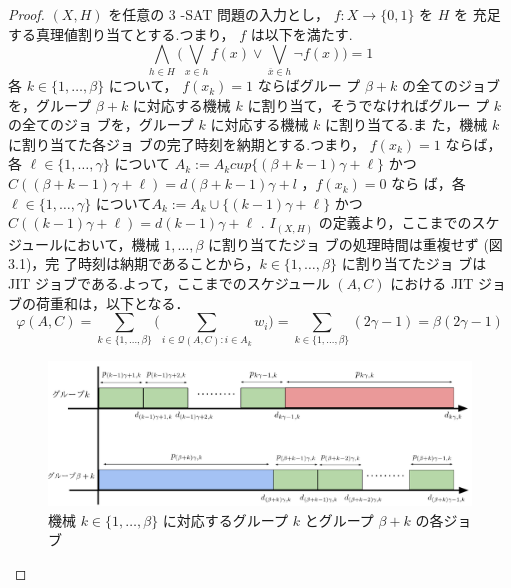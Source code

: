 \documentclass[12pt]{optlab-bachelor}
\begin{document}
\begin{proof}
  $(X,H)$ を任意の 3 -SAT 問題の入力とし， $f : X \to \{0,1\}$ を $H$ を
  充足する真理値割り当てとする.つまり， $f$ は以下を満たす.
  \begin{displaymath}
    \displaystyle \bigwedge_{h \in H} \bigg(\bigvee_{x \in h}f(x) \lor
    \bigvee_{\bar x \in h}\lnot f(x) \bigg) = 1
  \end{displaymath}
  各 $k \in \{1,\ldots, \beta\}$ について， $f(x_k) = 1$ ならばグルー
  プ $\beta + k$ の全てのジョブを，グループ $\beta + k$ に対応する機械
  $k$ に割り当て，そうでなければグルー
  プ $k$ の全てのジョ ブを，グループ $k$ に対応する機械 $k$ に割り当てる.ま
  た，機械 $k$ に割り当てた各ジョ ブの完了時刻を納期とする.つまり，
  $f(x_k) = 1$ ならば，各 $\ell \in \{1,\ldots,\gamma\}$ について $A_k
  :=A_k cup\{(\beta+k−1)\gamma+\ell\}$ かつ
  $C((\beta+k−1)\gamma+\ell)=d(\beta+k−1)\gamma+l$ ，$f(x_k)=0$ なら
  ば，各 $\ell \in \{1,\ldots,\gamma \}$ について$A_k :=A_k \cup
  \{(k−1)\gamma+\ell \}$ かつ $C((k−1)\gamma+\ell)=d(k−1)\gamma+\ell$
  . $I_{(X,H)}$ の定義より，ここまでのスケジュールにおいて，機械
  $1,\ldots, \beta$ に割り当てたジョ ブの処理時間は重複せず (図 3.1)，完
  了時刻は納期であることから，$k \in \{1,\ldots,\beta\}$ に割り当てたジョ
  ブは JIT ジョブである.よって，ここまでのスケジュール $(A, C)$ における
  JIT ジョブの荷重和は，以下となる．
  \begin{displaymath}
    \displaystyle \varphi(A,C) = \sum_{k \in
    \{1,\ldots,\beta\}}\bigg(\sum_{i \in \mathcal{Q}(A,C):i \in
    A_k}w_i\bigg) = \sum_{k \in \{1,\ldots,\beta\}}(2\gamma - 1) =
    \beta(2\gamma - 1)
  \end{displaymath}

  \begin{figure}[h]
    \centering
    \includegraphics[width = 15cm]{figure/SJIT.pdf}
    \caption{機械 $k \in \{1,\ldots,\beta\}$ に対応するグループ $k$
    とグループ $\beta + k$ の各ジョブ}
  \end{figure}


\end{proof}
\end{document}
